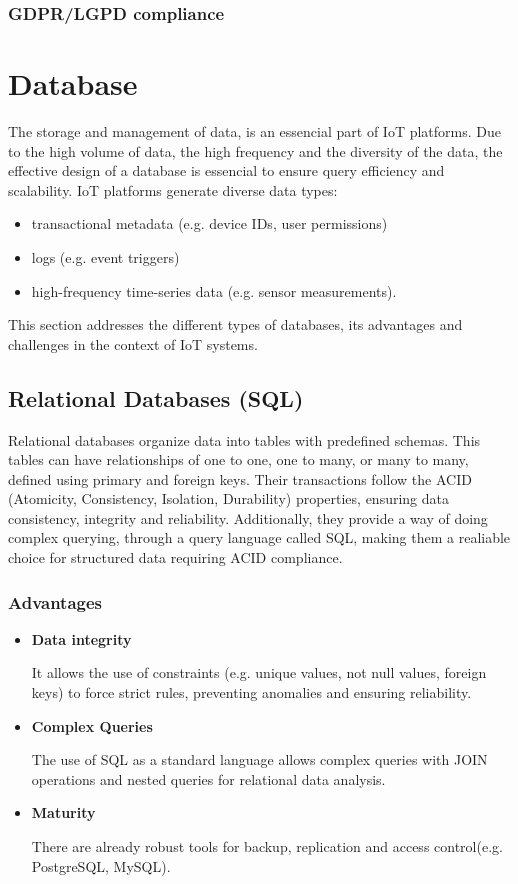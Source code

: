 \subsubsection{GDPR/LGPD compliance}


\section{Database}
The storage and management of data, is an essencial part of IoT platforms.
Due to the high volume of data, the high frequency and the diversity of the
data, the effective design of a database is essencial to ensure query efficiency
and scalability.
IoT platforms generate diverse data types:
\begin{itemize}
	\item transactional metadata (e.g. device  IDs, user permissions)
	\item logs (e.g. event triggers)
	\item high-frequency time-series data (e.g. sensor measurements).
\end{itemize}

This section addresses the different types of databases, its advantages and
challenges in the context of IoT systems.

\subsection{Relational Databases (SQL)}
Relational databases organize data into tables with predefined schemas.
This tables can have relationships of one to one, one to many, or many to many,
defined using primary and foreign keys. Their transactions follow the ACID
(Atomicity, Consistency, Isolation, Durability) properties, ensuring data
consistency, integrity and reliability. Additionally, they provide a way of
doing complex querying, through a query language called \gls{SQL}, making them
a realiable choice for structured data requiring ACID compliance.

\subsubsection{Advantages}

\begin{itemize}
	\item \textbf{Data integrity}

	      It allows the use of constraints (e.g. unique values, not null values,
	      foreign keys) to force strict rules, preventing anomalies and ensuring
	      reliability.

	\item \textbf{Complex Queries}

	      The use of SQL as a standard language allows complex queries with JOIN
	      operations and nested queries for relational data analysis.

	\item \textbf{Maturity}

	      There are already robust tools for backup, replication and access
	      control(e.g. PostgreSQL, MySQL).

\end{itemize}

